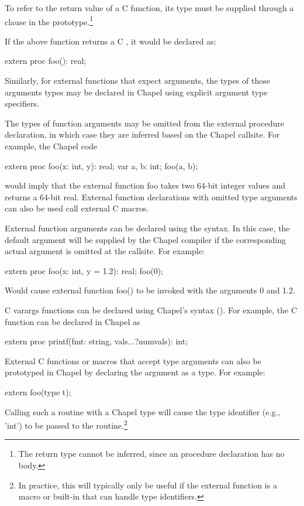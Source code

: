 To refer to the return value of a C function, its type must be supplied through
a  clause in the prototype.\footnote{The return type cannot be
inferred, since an  procedure declaration has no body.}

If the above function returns a C , it would be declared as:
\begin{chapel}
       extern proc foo(): real;
\end{chapel}
Similarly, for external functions that expect arguments, the types of those
arguments types may be declared in Chapel using explicit argument type specifiers.

The types of function arguments may be omitted from the external procedure
declaration, in which case they are inferred based on the Chapel callsite.
For example, the Chapel code
\begin{chapel}
       extern proc foo(x: int, y): real;
       var a, b: int;
       foo(a, b);
\end{chapel}
\noindent
would imply that the external function foo takes two 64-bit integer values
and returns a 64-bit real.  External function declarations with omitted type
arguments can also be used call external C macros.

External function arguments can be declared using the 
syntax.  In this case, the default argument will be supplied by the Chapel
compiler if the corresponding actual argument is omitted at the callsite.  For example:
\begin{chapel}
       extern proc foo(x: int, y = 1.2): real;
       foo(0);
\end{chapel}
Would cause external function foo() to be invoked with the arguments 0
and 1.2.

C varargs functions can be declared using
Chapel's  syntax ().  For example,
the C  function can be declared in Chapel as
\begin{chapel}
       extern proc printf(fmt: string, vals...?numvals): int;
\end{chapel}

External C functions or macros that accept type arguments can also be
prototyped in Chapel by declaring the argument as a type.  For
example:
\begin{chapel}
       extern foo(type t);
\end{chapel}
Calling such a routine with a Chapel type will cause the type
identifier (e.g., 'int') to be passed to the routine.\footnote{In practice,
this will typically only be useful if the external function is a macro
or built-in that can handle type identifiers.}

